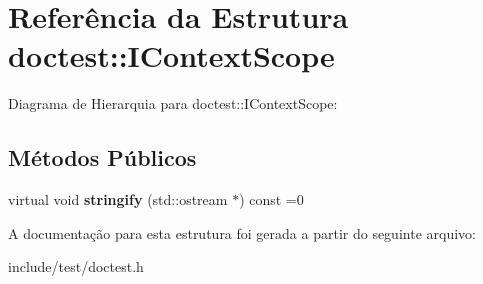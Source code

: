 \hypertarget{structdoctest_1_1IContextScope}{}\section{Referência da Estrutura doctest\+:\+:I\+Context\+Scope}
\label{structdoctest_1_1IContextScope}


Diagrama de Hierarquia para doctest\+:\+:I\+Context\+Scope\+:
\subsection*{Métodos Públicos}
\begin{DoxyCompactItemize}
\item 
\mbox{\label{structdoctest_1_1IContextScope_affbf0f9bf8107a4a8a805d237288141d}} 
virtual void {\bfseries stringify} (std\+::ostream $\ast$) const =0
\end{DoxyCompactItemize}


A documentação para esta estrutura foi gerada a partir do seguinte arquivo\+:\begin{DoxyCompactItemize}
\item 
include/test/doctest.\+h\end{DoxyCompactItemize}
